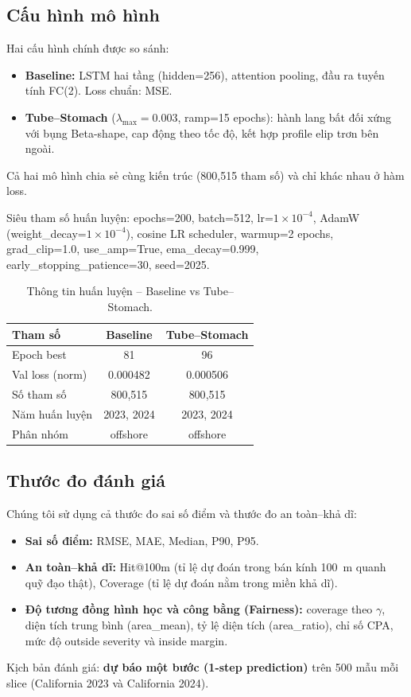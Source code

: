 \documentclass{IEEEtran}
\begin{document}
\subsection{Cấu hình mô hình}
Hai cấu hình chính được so sánh:
\begin{itemize}
  \item \textbf{Baseline:} LSTM hai tầng (hidden=256), attention pooling,
        đầu ra tuyến tính FC(2). Loss chuẩn: MSE.
  \item \textbf{Tube--Stomach} ($\lambda_{\max}=0.003$, ramp=15 epochs):
        hành lang bất đối xứng với bụng Beta-shape, cap động theo tốc độ,
        kết hợp profile elip trơn bên ngoài.
\end{itemize}
Cả hai mô hình chia sẻ cùng kiến trúc (800{,}515 tham số)
và chỉ khác nhau ở hàm loss.

Siêu tham số huấn luyện: epochs=200, batch=512,
lr=$1\times10^{-4}$, AdamW (weight\_decay=$1\times10^{-4}$),
cosine LR scheduler, warmup=2 epochs, grad\_clip=1.0, use\_amp=True,
ema\_decay=0.999, early\_stopping\_patience=30, seed=2025.

\begin{table}[H]
\centering
\renewcommand{\arraystretch}{1.2}
\caption{Thông tin huấn luyện -- Baseline vs Tube--Stomach.}
\label{tab:train-info}
\begin{tabular}{lcc}
\toprule
Tham số & Baseline & Tube--Stomach \\
\midrule
Epoch best      & 81  & 96 \\
Val loss (norm) & 0.000482 & 0.000506 \\
Số tham số      & 800{,}515 & 800{,}515 \\
Năm huấn luyện  & 2023, 2024 & 2023, 2024 \\
Phân nhóm       & offshore & offshore \\
\bottomrule
\end{tabular}
\end{table}

\subsection{Thước đo đánh giá}
Chúng tôi sử dụng cả thước đo sai số điểm và thước đo an toàn--khả dĩ:
\begin{itemize}
  \item \textbf{Sai số điểm:} RMSE, MAE, Median, P90, P95.
  \item \textbf{An toàn--khả dĩ:} Hit@100m (tỉ lệ dự đoán trong bán kính 100~m
        quanh quỹ đạo thật), Coverage (tỉ lệ dự đoán nằm trong miền khả dĩ).
  \item \textbf{Độ tương đồng hình học và công bằng (Fairness):}
        coverage theo $\gamma$, diện tích trung bình (area\_mean),
        tỷ lệ diện tích (area\_ratio), chỉ số CPA,
        mức độ outside severity và inside margin.
\end{itemize}
Kịch bản đánh giá: \textbf{dự báo một bước (1-step prediction)}
trên 500 mẫu mỗi slice (California 2023 và California 2024).
\end{document}
